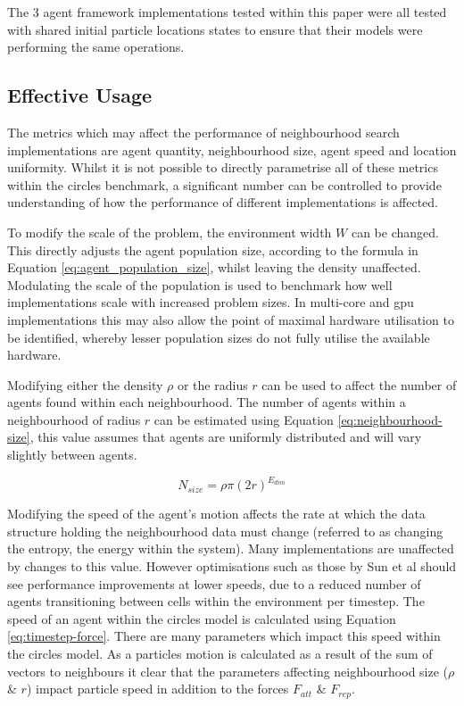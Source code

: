      The 3 agent framework implementations tested within this paper were all tested with shared initial particle locations states to ensure that their models were performing the same operations. 
  
  \subsection{Effective Usage\label{sec:effective-usage}}  
    The metrics which may affect the performance of neighbourhood search implementations are agent quantity, neighbourhood size, agent speed and location uniformity. Whilst it is not possible to directly parametrise all of these metrics within the circles benchmark, a significant number can be controlled to provide understanding of how the performance of different implementations is affected.
    
    To modify the scale of the problem, the environment width $W$ can be changed. This directly adjusts the agent population size, according to the formula in Equation \ref{eq:agent_population_size}, whilst leaving the density unaffected. Modulating the scale of the population is used to benchmark how well implementations scale with increased problem sizes. In multi-core and \gls{gpu} implementations this may also allow the point of maximal hardware utilisation to be identified, whereby lesser population sizes do not fully utilise the available hardware.
    
    Modifying either the density $\rho$ or the radius $r$ can be used to affect the number of agents found within each neighbourhood. The number of agents within a neighbourhood of radius $r$ can be estimated using Equation \ref{eq:neighbourhood-size}, this value assumes that agents are uniformly distributed and will vary slightly between agents.
    
    \begin{equation}\label{eq:neighbourhood-size}
        N_{size} = \rho \pi (2r)^{E_{dim}}
    \end{equation}
      
    Modifying the speed of the agent's motion affects the rate at which the data structure holding the neighbourhood data must change (referred to as changing the entropy, the energy within the system). Many implementations are unaffected by changes to this value. However optimisations such as those by Sun et al \cite{HY*15} should see performance improvements at lower speeds, due to a reduced number of agents transitioning between cells within the environment per timestep. The speed of an agent within the circles model is calculated using Equation \ref{eq:timestep-force}. There are many parameters which impact this speed within the circles model. As a particles motion is calculated as a result of the sum of vectors to neighbours it clear that the parameters affecting neighbourhood size ($\rho$ \& $r$) impact particle speed in addition to the forces $F_{att}$ \& $F_{rep}$.
    
